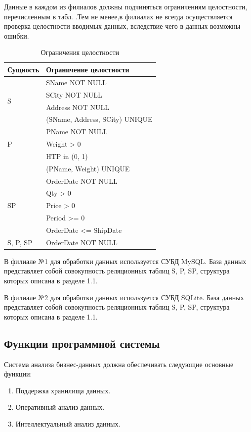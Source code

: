 Данные  в  каждом из  филиалов  должны  подчиняться ограничениям целостности, 
перечисленным в табл. .Тем не менее,в филиалах не всегда 
осуществляется проверка целостности вводимых данных, вследствие чего в данных 
возможны ошибки.
\begin{table}[h]
	\caption{\space Ограничения целостности}
	\label{integrity}
	\begin{tabular}{|p{4cm}|p{8cm}|}
		\hline
		\textbf{Сущность} & \textbf{Ограничение целостности} \\
		\hline
		\multirow{4}{*}{S} 	& SName NOT NULL \\
					& SCity NOT NULL \\
					& Address NOT NULL \\
					& (SName, Address, SCity) UNIQUE \\
		\hline
		\multirow{3}{*}{P}	& PName NOT NULL\\
					& Weight > 0\\
					& HTP in (0, 1) \\
					& (PName, Weight) UNIQUE \\
		\hline
		\multirow{5}{*}{SP}	& OrderDate NOT NULL \\
					& Qty > 0 \\
					& Price > 0 \\
					& Period >= 0 \\
					& OrderDate <= ShipDate \\
		\hline
		S, P, SP		& OrderDate NOT NULL \\
		\hline
	\end{tabular}
\end{table}
В филиале №1 для обработки данных используется СУБД MySQL. База данных представляет собой совокупность реляционных таблиц S, P, SP, структура которых описана в разделе 1.1.\par
В филиале №2 для обработки данных используется СУБД SQLite. База данных представляет собой совокупность реляционных таблиц S, P, SP, структура которых описана в разделе 1.1.\par

\subsection{Функции программной системы}
Система анализа бизнес-данных должна обеспечивать следующие основные функции:
\begin{enumerate}
  \item Поддержка хранилища данных.
  \item Оперативный анализ данных.
  \item Интеллектуальный анализ данных.
\end{enumerate}

